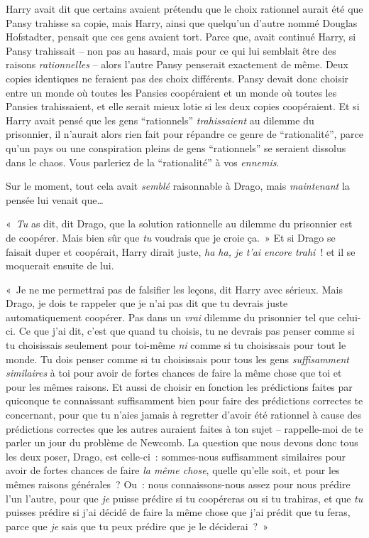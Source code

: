 Harry avait dit que certains avaient prétendu que le choix rationnel aurait été que Pansy trahisse sa copie, mais Harry, ainsi que quelqu'un d'autre nommé Douglas Hofstadter, pensait que ces gens avaient tort.
Parce que, avait continué Harry, si Pansy trahissait -- non pas au hasard, mais pour ce qui lui semblait être des raisons \emph{rationnelles} -- alors l'autre Pansy penserait exactement de même.
Deux copies identiques ne feraient pas des choix différents.
Pansy devait donc choisir entre un monde où toutes les Pansies coopéraient et un monde où toutes les Pansies trahissaient, et elle serait mieux lotie si les deux copies coopéraient.
Et si Harry avait pensé que les gens “rationnels” \emph{trahissaient} au dilemme du prisonnier, il n'aurait alors rien fait pour répandre ce genre de “rationalité”, parce qu'un pays ou une conspiration pleins de gens “rationnels” se seraient dissolus dans le chaos.
Vous parleriez de la “rationalité” à vos \emph{ennemis}.

Sur le moment, tout cela avait \emph{semblé} raisonnable à Drago, mais \emph{maintenant} la pensée lui venait que…

«~\emph{Tu} as dit, dit Drago, que la solution rationnelle au dilemme du prisonnier est de coopérer.
Mais bien sûr que \emph{tu} voudrais que je croie ça.~»
Et si Drago se faisait duper et coopérait, Harry dirait juste, \emph{ha ha, je t'ai encore trahi}~! et il se moquerait ensuite de lui.

«~Je ne me permettrai pas de falsifier les leçons, dit Harry avec sérieux.
Mais Drago, je dois te rappeler que je n'ai pas dit que tu devrais juste automatiquement coopérer.
Pas dans un \emph{vrai} dilemme du prisonnier tel que celui-ci.
Ce que j'ai dit, c'est que quand tu choisis, tu ne devrais pas penser comme si tu choisissais seulement pour toi-même \emph{ni} comme si tu choisissais pour tout le monde.
Tu dois penser comme si tu choisissais pour tous les gens \emph{suffisamment similaires} à toi pour avoir de fortes chances de faire la même chose que toi et pour les mêmes raisons.
Et aussi de choisir en fonction les prédictions faites par quiconque te connaissant suffisamment bien pour faire des prédictions correctes te concernant, pour que tu n'aies jamais à regretter d'avoir été rationnel à cause des prédictions correctes que les autres auraient faites à ton sujet -- rappelle-moi de te parler un jour du problème de Newcomb.
La question que nous devons donc tous les deux poser, Drago, est celle-ci~: sommes-nous suffisamment similaires pour avoir de fortes chances de faire \emph{la même chose}, quelle qu'elle soit, et pour les mêmes raisons générales~?
Ou~: nous connaissons-nous assez pour nous prédire l'un l'autre, pour que \emph{je} puisse prédire si tu coopéreras ou si tu trahiras, et que \emph{tu} puisses prédire si j'ai décidé de faire la même chose que j'ai prédit que tu feras, parce que \emph{je} sais que tu peux prédire que je le déciderai~?~»

